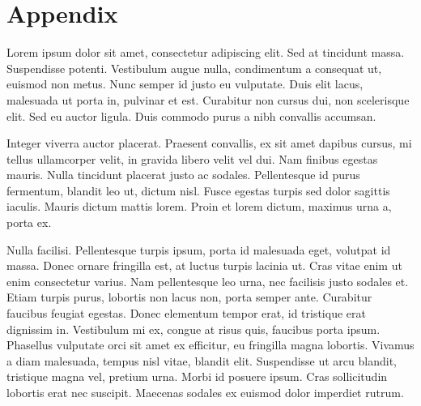\section{Appendix}
Lorem ipsum dolor sit amet, consectetur adipiscing elit. Sed at tincidunt massa. Suspendisse potenti. Vestibulum augue nulla, condimentum a consequat ut, euismod non metus. Nunc semper id justo eu vulputate. Duis elit lacus, malesuada ut porta in, pulvinar et est. Curabitur non cursus dui, non scelerisque elit. Sed eu auctor ligula. Duis commodo purus a nibh convallis accumsan.

Integer viverra auctor placerat. Praesent convallis, ex sit amet dapibus cursus, mi tellus ullamcorper velit, in gravida libero velit vel dui. Nam finibus egestas mauris. Nulla tincidunt placerat justo ac sodales. Pellentesque id purus fermentum, blandit leo ut, dictum nisl. Fusce egestas turpis sed dolor sagittis iaculis. Mauris dictum mattis lorem. Proin et lorem dictum, maximus urna a, porta ex.

Nulla facilisi. Pellentesque turpis ipsum, porta id malesuada eget, volutpat id massa. Donec ornare fringilla est, at luctus turpis lacinia ut. Cras vitae enim ut enim consectetur varius. Nam pellentesque leo urna, nec facilisis justo sodales et. Etiam turpis purus, lobortis non lacus non, porta semper ante. Curabitur faucibus feugiat egestas. Donec elementum tempor erat, id tristique erat dignissim in. Vestibulum mi ex, congue at risus quis, faucibus porta ipsum. Phasellus vulputate orci sit amet ex efficitur, eu fringilla magna lobortis. Vivamus a diam malesuada, tempus nisl vitae, blandit elit. Suspendisse ut arcu blandit, tristique magna vel, pretium urna. Morbi id posuere ipsum. Cras sollicitudin lobortis erat nec suscipit. Maecenas sodales ex euismod dolor imperdiet rutrum.

